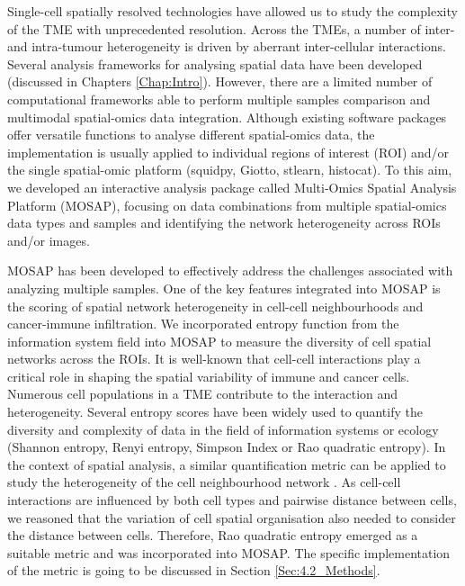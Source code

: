Single-cell spatially resolved technologies have allowed us to study the complexity of the TME with unprecedented resolution. Across the TMEs, a number of inter- and intra-tumour heterogeneity is driven by aberrant inter-cellular interactions. Several analysis frameworks for analysing spatial data have been developed (discussed in Chapters \ref{Chap:Intro}). However, there are a limited number of computational frameworks able to perform multiple samples comparison and multimodal spatial-omics data integration. Although existing software packages offer versatile functions to analyse different spatial-omics data, the implementation is usually applied to individual regions of interest (ROI) and/or the single spatial-omic platform (\ie squidpy\cite{palla2022squidpy}, Giotto\cite{dries2021giotto}, stlearn\cite{pham2020stlearn}, histocat\cite{schapiro2017histocat}). To this aim, we developed an interactive analysis package called Multi-Omics Spatial Analysis Platform (MOSAP), focusing on data combinations from multiple spatial-omics data types and samples and identifying the network heterogeneity across ROIs and/or images. 

MOSAP has been developed to effectively address the challenges associated with analyzing multiple samples. One of the key features integrated into MOSAP is the scoring of spatial network heterogeneity in cell-cell neighbourhoods and cancer-immune infiltration. We incorporated entropy function\cite{botta2005rao} from the information system field into MOSAP to measure the diversity of cell spatial networks across the ROIs. It is well-known that cell-cell interactions play a critical role in shaping the spatial variability of immune and cancer cells. Numerous cell populations in a TME contribute to the interaction and heterogeneity. Several entropy scores have been widely used to quantify the diversity and complexity of data in the field of information systems or ecology (\ie Shannon entropy, Renyi entropy, Simpson Index or Rao quadratic entropy). In the context of spatial analysis, a similar quantification metric can be applied to study the heterogeneity of the cell neighbourhood network \cite{pienta2008ecological, botta2005rao, martinelli2022athena}. As cell-cell interactions are influenced by both cell types and pairwise distance between cells, we reasoned that the variation of cell spatial organisation also needed to consider the distance between cells. Therefore, Rao quadratic entropy emerged as a suitable metric and was incorporated into MOSAP. The specific implementation of the metric is going to be discussed in Section \ref{Sec:4.2_Methods}. 

